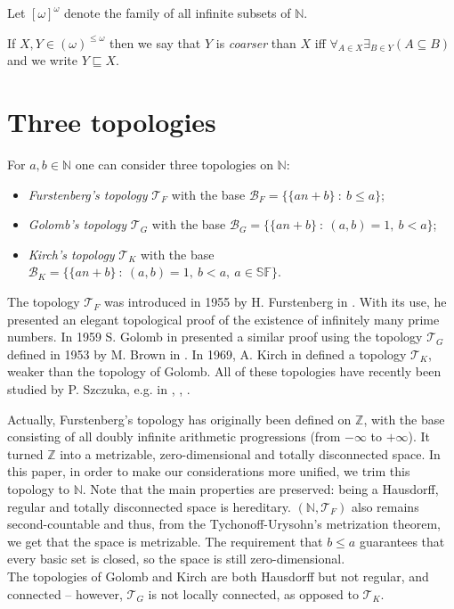 \documentclass{amsart}
\theoremstyle{definition}
\theoremstyle{definition}
\newcommand{\N}{{\mathbb N}}
\newcommand{\Z}{{\mathbb Z}}
\newcommand{\T}{\mathcal{T}}
\newcommand{\B}{\mathcal{B}}
\newcommand{\SqrFr}{\mathbb{SF}}
\newcommand{\Partitions}{(\omega)^{\leq \omega}}
\begin{document}
Let $[\omega]^\omega$ denote the family of all infinite subsets of $\N$. 

 If $X, Y \in \Partitions$ then we say that $Y$ is
{\it coarser} than $X$ iff
  $\forall_{A \in X} \exists_{B \in Y} (A \subseteq B)$
and we write $Y \sqsubseteq X$.




\section*{Three topologies}

For $a,b\in\N$ one can consider three topologies on $\N$:
\begin{itemize}
\item \emph{Furstenberg's topology} $\T_F$ with the base $\B_F = \{\{an+b\}\ :\ b\leq a\}$;
\item \emph{Golomb's topology} $\T_G$ with the base $\B_G = \{\{an+b\}\ :\ (a,b)=1,\ b<a\}$;
\item \emph{Kirch's topology} $\T_K$ with the base $\B_K = \{\{an+b\}\ :\ (a,b)=1,\ b<a,\ a\in\SqrFr\}$.
\end{itemize}

The topology $\T_F$ was introduced in 1955 by H. Furstenberg in \cite{F}. With its use, he presented an elegant topological proof of the existence of infinitely many prime numbers. In 1959 S. Golomb in \cite{G} presented a similar proof using the topology $\T_G$ defined in 1953 by M. Brown in \cite{B}. In 1969, A. Kirch in \cite{K} defined a topology $\T_K$, weaker than the topology of Golomb. All of these topologies have recently been studied by P. Szczuka, e.g. in \cite{Szczuka1}, \cite{Szczuka2}, \cite{Szczuka3}.


Actually, Furstenberg's topology has originally been defined on $\Z$, with the base consisting of all doubly infinite arithmetic progressions (from $-\infty$ to $+\infty$). It turned $\Z$ into a metrizable, zero-dimensional and totally disconnected space. In this paper, in order to make our considerations more unified, we trim this topology to $\N$. Note that the main properties are preserved: being a Hausdorff, regular and totally disconnected space is hereditary. $(\N,\T_F)$ also remains second-countable and thus, from the Tychonoff-Urysohn's metrization theorem, we get that the space is metrizable. The requirement that $b\leq a$ guarantees that every basic set is closed, so the space is still zero-dimensional.\\
The topologies of Golomb and Kirch are both Hausdorff but not regular, and connected -- however, $\T_G$ is not locally connected, as opposed to $\T_K$.
\end{document}
